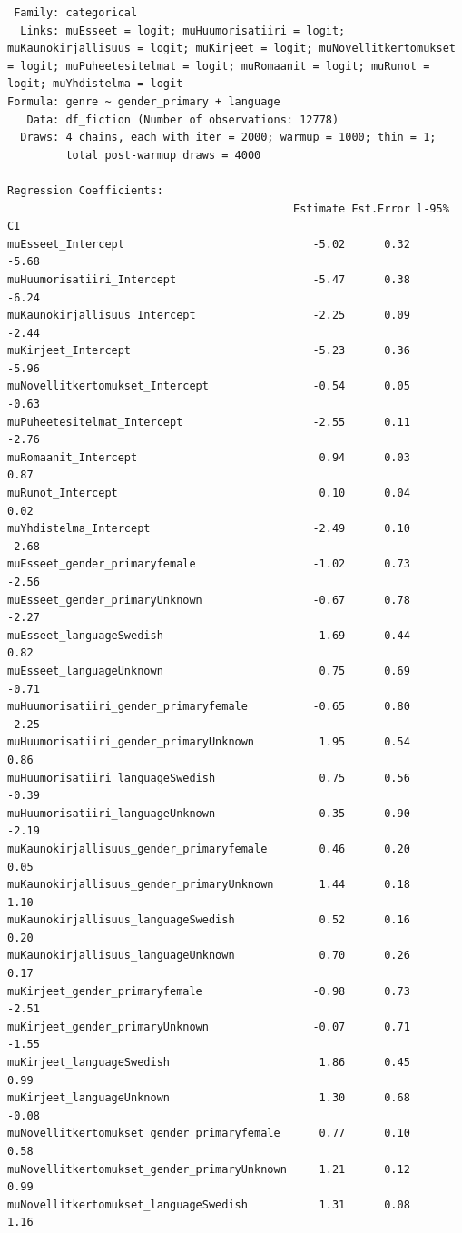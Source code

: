 \documentclass[
  letterpaper,
  DIV=11,
  numbers=noendperiod]{scrartcl}
\begin{document}
\begin{verbatim}
 Family: categorical 
  Links: muEsseet = logit; muHuumorisatiiri = logit; muKaunokirjallisuus = logit; muKirjeet = logit; muNovellitkertomukset = logit; muPuheetesitelmat = logit; muRomaanit = logit; muRunot = logit; muYhdistelma = logit 
Formula: genre ~ gender_primary + language 
   Data: df_fiction (Number of observations: 12778) 
  Draws: 4 chains, each with iter = 2000; warmup = 1000; thin = 1;
         total post-warmup draws = 4000

Regression Coefficients:
                                            Estimate Est.Error l-95% CI
muEsseet_Intercept                             -5.02      0.32    -5.68
muHuumorisatiiri_Intercept                     -5.47      0.38    -6.24
muKaunokirjallisuus_Intercept                  -2.25      0.09    -2.44
muKirjeet_Intercept                            -5.23      0.36    -5.96
muNovellitkertomukset_Intercept                -0.54      0.05    -0.63
muPuheetesitelmat_Intercept                    -2.55      0.11    -2.76
muRomaanit_Intercept                            0.94      0.03     0.87
muRunot_Intercept                               0.10      0.04     0.02
muYhdistelma_Intercept                         -2.49      0.10    -2.68
muEsseet_gender_primaryfemale                  -1.02      0.73    -2.56
muEsseet_gender_primaryUnknown                 -0.67      0.78    -2.27
muEsseet_languageSwedish                        1.69      0.44     0.82
muEsseet_languageUnknown                        0.75      0.69    -0.71
muHuumorisatiiri_gender_primaryfemale          -0.65      0.80    -2.25
muHuumorisatiiri_gender_primaryUnknown          1.95      0.54     0.86
muHuumorisatiiri_languageSwedish                0.75      0.56    -0.39
muHuumorisatiiri_languageUnknown               -0.35      0.90    -2.19
muKaunokirjallisuus_gender_primaryfemale        0.46      0.20     0.05
muKaunokirjallisuus_gender_primaryUnknown       1.44      0.18     1.10
muKaunokirjallisuus_languageSwedish             0.52      0.16     0.20
muKaunokirjallisuus_languageUnknown             0.70      0.26     0.17
muKirjeet_gender_primaryfemale                 -0.98      0.73    -2.51
muKirjeet_gender_primaryUnknown                -0.07      0.71    -1.55
muKirjeet_languageSwedish                       1.86      0.45     0.99
muKirjeet_languageUnknown                       1.30      0.68    -0.08
muNovellitkertomukset_gender_primaryfemale      0.77      0.10     0.58
muNovellitkertomukset_gender_primaryUnknown     1.21      0.12     0.99
muNovellitkertomukset_languageSwedish           1.31      0.08     1.16

\end{verbatim}
\end{document}
